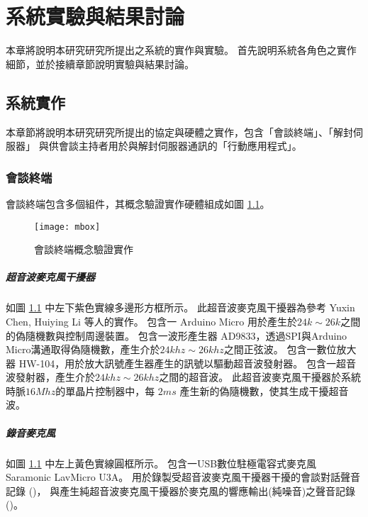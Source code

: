 \chapter{系統實驗與結果討論}

    本章將說明本研究研究所提出之系統的實作與實驗。
首先說明系統各角色之實作細節，並於接續章節說明實驗與結果討論。

\section{系統實作}\label{sec:impl}

    本章節將說明本研究研究所提出的協定與硬體之實作，包含「會談終端」、「解封伺服器」
與供會談主持者用於與解封伺服器通訊的「行動應用程式」。

\subsection{會談終端}\label{subsec:impl-mbox}

    會談終端包含多個組件，其概念驗證實作硬體組成如圖 \ref{fig:mbox}。

\begin{figure}[H]
    \centering
    \texttt{[image: mbox]}
    \caption{會談終端概念驗證實作}\label{fig:mbox}
\end{figure}


\paragraph{超音波麥克風干擾器}

    如圖 \ref{fig:mbox} 中左下紫色實線多邊形方框所示。
此超音波麥克風干擾器為參考 Yuxin Chen, Huiying Li 等人的實作\cite{chen2020wearable}。
包含一 Arduino Micro 用於產生於$24k\sim26k$之間的偽隨機數與控制周邊裝置。
包含一波形產生器 AD9833，透過SPI與Arduino Micro溝通取得偽隨機數，產生介於$24khz\sim26khz$之間正弦波。
包含一數位放大器 HW-104，用於放大訊號產生器產生的訊號以驅動超音波發射器。
包含一超音波發射器，產生介於$24khz\sim26khz$之間的超音波。
此超音波麥克風干擾器於系統時脈$16Mhz$的單晶片控制器中，每 $2ms$ 產生新的偽隨機數，使其生成干擾超音波。

\paragraph{錄音麥克風}

    如圖 \ref{fig:mbox} 中左上黃色實線圓框所示。
包含一USB數位駐極電容式麥克風 Saramonic LavMicro U3A。
用於錄製受超音波麥克風干擾器干擾的會談對話聲音記錄 (\DEFrecJ)，
與產生純超音波麥克風干擾器於麥克風的響應輸出(純噪音)之聲音記錄 (\DEFrecN)。


